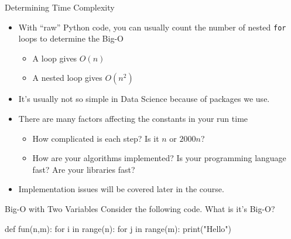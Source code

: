 \documentclass[
  ignorenonframetext,
]{beamer}
\newenvironment{Shaded}{\begin{snugshade}}{\end{snugshade}}
\newcommand{\BuiltInTok}[1]{\textcolor[rgb]{0.00,0.23,0.31}{#1}}
\newcommand{\ControlFlowTok}[1]{\textcolor[rgb]{0.00,0.23,0.31}{#1}}
\newcommand{\KeywordTok}[1]{\textcolor[rgb]{0.00,0.23,0.31}{#1}}
\newcommand{\NormalTok}[1]{\textcolor[rgb]{0.00,0.23,0.31}{#1}}
\newcommand{\StringTok}[1]{\textcolor[rgb]{0.13,0.47,0.30}{#1}}
\begin{document}
\begin{frame}[fragile]{Determining Time Complexity}
\protect\hypertarget{determining-time-complexity-1}{}
\begin{itemize}
\item
  With ``raw'' Python code, you can usually count the number of nested
  \texttt{for} loops to determine the Big-O

  \begin{itemize}
  \item
    A loop gives \(O(n)\)
  \item
    A nested loop gives \(O(n^2)\)
  \end{itemize}
\item
  It's usually not so simple in Data Science because of packages we use.
\item
  There are many factors affecting the constants in your run time

  \begin{itemize}
  \item
    How complicated is each step? Is it \(n\) or \(2000n\)?
  \item
    How are your algorithms implemented? Is your programming language
    fast? Are your libraries fast?
  \end{itemize}
\item
  Implementation issues will be covered later in the course.
\end{itemize}
\end{frame}

\begin{frame}[fragile]{Big-O with Two Variables}
\protect\hypertarget{big-o-with-two-variables}{}
Consider the following code. What is it's Big-O?

\begin{Shaded}
\begin{Highlighting}[]
\KeywordTok{def}\NormalTok{ fun(n,m):}
  \ControlFlowTok{for}\NormalTok{ i }\KeywordTok{in} \BuiltInTok{range}\NormalTok{(n):}
    \ControlFlowTok{for}\NormalTok{ j }\KeywordTok{in} \BuiltInTok{range}\NormalTok{(m):}
      \BuiltInTok{print}\NormalTok{(}\StringTok{"Hello"}\NormalTok{)}
\end{Highlighting}
\end{Shaded}
\end{frame}
\end{document}
